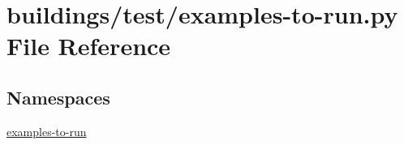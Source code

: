 \hypertarget{buildings_2test_2examples-to-run_8py}{}\section{buildings/test/examples-\/to-\/run.py File Reference}
\label{buildings_2test_2examples-to-run_8py}
\subsection*{Namespaces}
\begin{DoxyCompactItemize}
\item 
 \hyperlink{namespaceexamples-to-run}{examples-\/to-\/run}
\end{DoxyCompactItemize}
